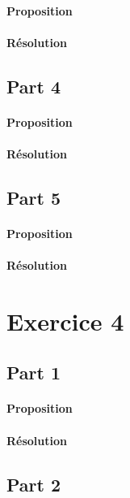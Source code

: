 \documentclass{article}
\begin{document}
\paragraph{Proposition}

\paragraph{Résolution}


\subsection{Part 4}
\paragraph{Proposition}

\paragraph{Résolution}


\subsection{Part 5}
\paragraph{Proposition}

\paragraph{Résolution}



\section{Exercice 4}
\subsection{Part 1}
\paragraph{Proposition}

\paragraph{Résolution}


\subsection{Part 2}
\end{document}
